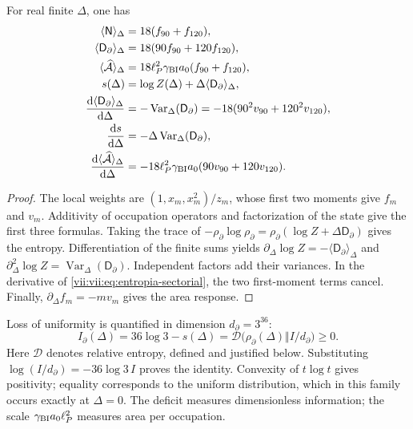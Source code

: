 \begin{proposition}
\label{vii:vii:prop:respuesta-sectorial}
For real finite \(\Delta\), one has
\begin{align}
 \langle\mathsf N\rangle_\Delta&=18(f_{90}+f_{120}),\\
 \langle\mathsf D_\partial\rangle_\Delta&=18(90f_{90}+120f_{120}),\\
 \langle\widehat{\mathcal A}\rangle_\Delta
 &=18\ell_P^2\gamma_{\rm BI}a_0(f_{90}+f_{120}),\\
 s(\Delta)&=\log Z(\Delta)+\Delta\langle\mathsf D_\partial\rangle_\Delta,
 \label{vii:vii:eq:entropia-sectorial}\\
 \frac{\mathrm d\langle\mathsf D_\partial\rangle_\Delta}{\mathrm d\Delta}
 &=-\operatorname{Var}_\Delta(\mathsf D_\partial)
  =-18(90^2v_{90}+120^2v_{120}),\\
 \frac{\mathrm ds}{\mathrm d\Delta}
 &=-\Delta\operatorname{Var}_\Delta(\mathsf D_\partial),\\
 \frac{\mathrm d\langle\widehat{\mathcal A}\rangle_\Delta}{\mathrm d\Delta}
 &=-18\ell_P^2\gamma_{\rm BI}a_0(90v_{90}+120v_{120}).
 \label{vii:vii:eq:respuestas-area-entropia}
\end{align}
\end{proposition}
\begin{proof}
The local weights are \((1,x_m,x_m^2)/z_m\), whose first two
moments give \(f_m\) and \(v_m\). Additivity of occupation
operators and factorization of the state give the first three formulas.
Taking the trace of
\(-\rho_\partial\log\rho_\partial
=\rho_\partial(\log Z+\Delta\mathsf D_\partial)\)
gives the entropy. Differentiation of the finite sums yields
\(\partial_\Delta\log Z=-\langle\mathsf D_\partial\rangle_\Delta\)
and \(\partial_\Delta^2\log Z
=\operatorname{Var}_\Delta(\mathsf D_\partial)\).
Independent factors add their variances. In the derivative of
\eqref{vii:vii:eq:entropia-sectorial}, the two first-moment
terms cancel. Finally, \(\partial_\Delta f_m=-mv_m\)
gives the area response.
\end{proof}

Loss of uniformity is quantified in dimension \(d_\partial=3^{36}\):
\begin{equation}
 I_\partial(\Delta)
 =36\log3-s(\Delta)
 =\mathcal D\bigl(\rho_\partial(\Delta)\Vert I/d_\partial\bigr)\ge0.
 \label{vii:vii:eq:deficit-informacional}
\end{equation}
Here \(\mathcal D\) denotes relative entropy, defined and justified
below. Substituting \(\log(I/d_\partial)=-36\log3\,I\) proves the
identity. Convexity of \(t\log t\) gives positivity; equality
corresponds to the uniform distribution, which in this family occurs
exactly at \(\Delta=0\). The deficit measures dimensionless information;
the scale \(\gamma_{\rm BI}a_0\ell_P^2\) measures area per occupation.

